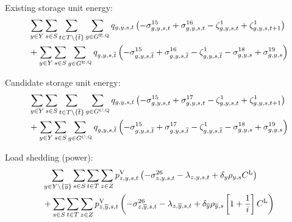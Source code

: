 \documentclass{article}
\begin{document}
Existing storage unit energy:
\begin{align}
	& \sum\limits_{\iYear \in \sYears}\sum\limits_{\iScenario \in \sScenarios} \sum\limits_{\iInterval \in \sIntervals \setminus \{\iIntervalTerminal\}} \sum\limits_{\iGenerator \in \sStorageExisting} \vStorageUnitEnergy \left(- \dNonNegativeStorageEnergy + \dMaxStorageEnergyExisting - \dStorageEnergyTransition + \dStorageEnergyTransition[\iGenerator,\iYear,\iScenario,\iInterval+1] \right)\\
	& + \sum\limits_{\iYear \in \sYears}\sum\limits_{\iScenario \in \sScenarios}\sum\limits_{\iGenerator \in \sStorageExisting} \vStorageUnitEnergy[\iGenerator,\iYear,\iScenario,\iIntervalTerminal] \left(- \dNonNegativeStorageEnergy[\iGenerator,\iYear,\iScenario,\iIntervalTerminal] + \dMaxStorageEnergyExisting[\iGenerator,\iYear,\iScenario,\iIntervalTerminal] - \dStorageEnergyTransition[\iGenerator,\iYear,\iScenario,\iIntervalTerminal] - \dMinStorageEnergyIntervalEnd + \dMaxStorageEnergyIntervalEnd \right)\\
\end{align}

Candidate storage unit energy:
\begin{align}
	& \sum\limits_{\iYear \in \sYears}\sum\limits_{\iScenario \in \sScenarios} \sum\limits_{\iInterval \in \sIntervals \setminus \{\iIntervalTerminal\}} \sum\limits_{\iGenerator \in \sStorageCandidate} \vStorageUnitEnergy \left(- \dNonNegativeStorageEnergy + \dMaxStorageEnergyCandidate - \dStorageEnergyTransition + \dStorageEnergyTransition[\iGenerator,\iYear,\iScenario,\iInterval+1] \right)\\
	& + \sum\limits_{\iYear \in \sYears}\sum\limits_{\iScenario \in \sScenarios}\sum\limits_{\iGenerator \in \sStorageCandidate} \vStorageUnitEnergy[\iGenerator,\iYear,\iScenario,\iIntervalTerminal] \left(- \dNonNegativeStorageEnergy[\iGenerator,\iYear,\iScenario,\iIntervalTerminal] + \dMaxStorageEnergyCandidate[\iGenerator,\iYear,\iScenario,\iIntervalTerminal] - \dStorageEnergyTransition[\iGenerator,\iYear,\iScenario,\iIntervalTerminal] - \dMinStorageEnergyIntervalEnd + \dMaxStorageEnergyIntervalEnd \right)\\
\end{align}

Load shedding (power):
\begin{align}
	& \sum\limits_{\iYear \in \sYears 
		\setminus \{\iYearTerminal\}
	} \sum\limits_{\iScenario \in \sScenarios} \sum\limits_{\iInterval \in \sIntervals} \sum\limits_{\iZone \in \sZones} \vLostLoadPower \left(- \dNonNegativeLostLoad - \dPowerBalance + \cDiscountRate \cScenarioDuration \cLostLoadCost\right)\\
	& + \sum\limits_{\iScenario \in \sScenarios} \sum\limits_{\iInterval \in \sIntervals} \sum\limits_{\iZone \in \sZones} \vLostLoadPower[\iZone,\iYearTerminal,\iScenario,\iInterval] \left(- \dNonNegativeLostLoad[\iZone,\iYearTerminal,\iScenario,\iInterval] - \dPowerBalance[\iZone,\iYearTerminal,\iScenario,\iInterval] + \cDiscountRate[\iYearTerminal] \cScenarioDuration[\iYearTerminal,\iScenario] \left[1 + \frac{1}{\cInterestRate}\right] \cLostLoadCost\right)\\
\end{align}
\end{document}
